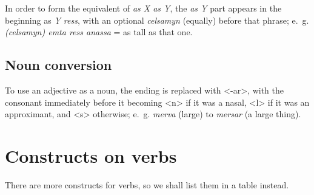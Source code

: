 \documentclass{book}
\begin{document}
In order to form the equivalent of \emph{as X as Y}, the \emph{as Y} part appears in the beginning as \emph{Y ress}, with an optional \emph{celsamyn} (equally) before that phrase; e.~g. \emph{(celsamyn) emta ress anassa} = as tall as that one.

\subsection{Noun conversion}

To use an adjective as a noun, the ending is replaced with <-ar>, with the consonant immediately before it becoming <n> if it was a nasal, <l> if it was an approximant, and <s> otherwise; e.~g. \emph{merva} (large) to \emph{mersar} (a large thing).

\newpage

\section{Constructs on verbs}

\label{sec:verbcons}

There are more constructs for verbs, so we shall list them in a table instead.
\end{document}
